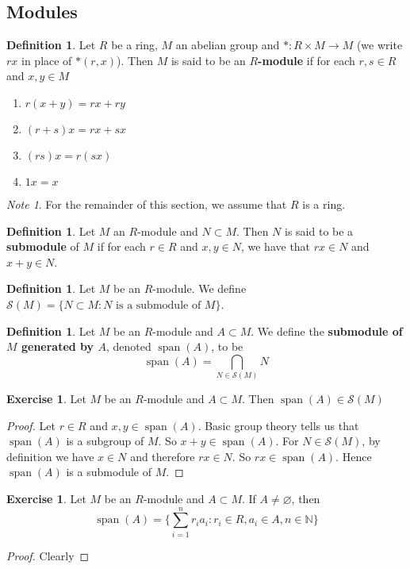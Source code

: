 \documentclass[12pt]{amsart}
\theoremstyle{definition}
\newtheorem{defn}[definition]{Definition}
\theoremstyle{remark}
\newtheorem{note}[remark]{Note}
\theoremstyle{definition}
\newtheorem{ex}[definition]{Exercise}
\newcommand{\N}{\mathbb{N}}
\newcommand{\MS}{\mathcal{S}}
\DeclareMathOperator{\spn}{span}
\begin{document}
	\subsection{Modules}
	
	\begin{defn}
	Let $R$ be a ring, $M$ an abelian group and $*: R 
	\times M \rightarrow M$ (we write $rx$ in place of 
	$*(r,x)$). Then $M$ is said to be an 
	\textbf{$R$-module}
	if for each $r,s \in R$ and $x,y \in M$
	\begin{enumerate}
	\item $r(x+y) = rx + ry$
	\item $(r+s)x = rx + sx$
	\item $(rs)x = r(sx)$
	\item $1x = x$ 
	\end{enumerate}
	\end{defn}
	
	\begin{note}
	For the remainder of this section, we assume that $R$ is a ring. 
	\end{note}
	
	\begin{defn}
	Let $M$ an $R$-module and $N \subset M$. Then $N$ is said to be a \textbf{submodule} of $M$ if for each $r \in R$ and $x,y \in N$, we have that $rx \in N$ and $x+y \in N$.
	\end{defn}
	
	\begin{defn}
	Let $M$ be an $R$-module. We define $\MS(M) = \{N \subset M: N \text{ is a submodule of }M\}$.
	\end{defn}	
	
	\begin{defn}
	Let $M$ be an $R$-module and $A \subset M$. We define the \textbf{submodule of $M$ generated by $A$}, denoted $\spn(A)$, to be $$\spn(A) = \bigcap_{N \in \MS(M)} N$$ 
	\end{defn}
	
	\begin{ex}
	Let $M$ be an $R$-module and $A \subset M$. Then 
	$\spn(A) \in \MS(M)$
	\end{ex}
	
	\begin{proof}
	Let $r \in R$ and $x,y \in \spn(A)$. Basic group theory tells us that $\spn(A)$ is a subgroup of $M$. So $x+y \in \spn(A)$. For $N \in \MS(M)$, by definition we have $x \in N$ and therefore $rx \in N$. So $rx \in \spn(A)$. Hence $\spn(A)$ is a submodule of $M$.
	\end{proof}
	
	\begin{ex}
	Let $M$ be an $R$-module and $A \subset M$. If $A \neq \varnothing$, then $$\spn(A) = \bigg \{\sum\limits_{i=1}^n r_ia_i: r_i \in R, a_i \in A, n \in \N \bigg \}$$
	\end{ex}
	
	\begin{proof}
	Clearly 
	\end{proof}
	
	
	
	
	
	
\end{document}
